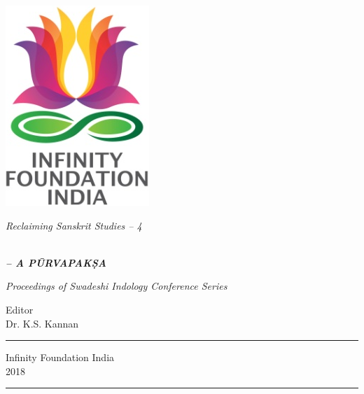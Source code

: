 \thispagestyle{empty}
\begin{center}
\includegraphics[scale=0.3]{figures/logo.png}
\bigskip

{\fontsize{10}{14}\selectfont\sl
Reclaiming Sanskrit Studies -- 4}

\bigskip
\end{center}
\medskip

\begin{center}
{\fontsize{20}{24}}\\[10pt]
{\sl\bfseries{}\fontsize{20}{24}\selectfont -- A PŪRVAPAKṢA}
\bigskip

{\sl\small Proceedings of Swadeshi Indology Conference Series}

\vfill


{\fontsize{14}{18}\selectfont 
Editor\\
Dr. K.S. Kannan\par
}
\vfill

\rule{5cm}{1pt}

{\fontsize{12}{14}\selectfont
Infinity Foundation India\\[4pt]
2018}

\rule{5cm}{1pt}
\end{center}





